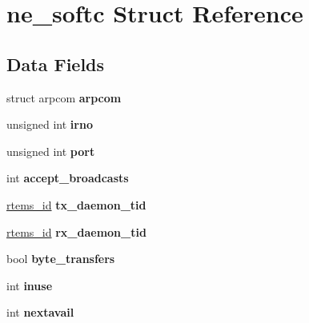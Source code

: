 \hypertarget{structne__softc}{}\section{ne\+\_\+softc Struct Reference}
\label{structne__softc}
\subsection*{Data Fields}
\begin{DoxyCompactItemize}
\item 
\mbox{\label{structne__softc_a0721cbce571be5c051d79d119368db97}} 
struct arpcom {\bfseries arpcom}
\item 
\mbox{\label{structne__softc_a54dbe1a35bf4cde36280d80c4a08e9fa}} 
unsigned int {\bfseries irno}
\item 
\mbox{\label{structne__softc_ac042a8921cdf55ac91c7ee468d327491}} 
unsigned int {\bfseries port}
\item 
\mbox{\label{structne__softc_af2a8e0545d05fab131aec164b43539e0}} 
int {\bfseries accept\+\_\+broadcasts}
\item 
\mbox{\label{structne__softc_a9ed50e3276ff87f5aa1fa8e022733ec0}} 
\mbox{\hyperlink{group__ClassicTasks_gab20892b814dced7dd4e5b9bf42becd57}{rtems\+\_\+id}} {\bfseries tx\+\_\+daemon\+\_\+tid}
\item 
\mbox{\label{structne__softc_a0538095543be1db4d32edaaf02a71744}} 
\mbox{\hyperlink{group__ClassicTasks_gab20892b814dced7dd4e5b9bf42becd57}{rtems\+\_\+id}} {\bfseries rx\+\_\+daemon\+\_\+tid}
\item 
\mbox{\label{structne__softc_ac73f0769d8664709f9be2fdf69177444}} 
bool {\bfseries byte\+\_\+transfers}
\item 
\mbox{\label{structne__softc_ab5f39be37fad917a8b20c9bbc483b193}} 
int {\bfseries inuse}
\item 
\mbox{\label{structne__softc_af836ddca1f1718f9cb05cefe2915d703}} 
int {\bfseries nextavail}
\item 

\end{DoxyCompactItemize}
